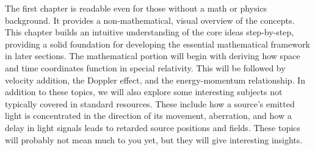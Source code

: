 The first chapter is readable even for those without a math or physics background. It provides a non-mathematical, visual overview of the concepts. This chapter builds an intuitive understanding of the core ideas step-by-step, providing a solid foundation for developing the essential mathematical framework in later sections. The mathematical portion will begin with deriving how space and time coordinates function in special relativity. This will be followed by velocity addition, the Doppler effect, and the energy-momentum relationship. In addition to these topics, we will also explore some interesting subjects not typically covered in standard resources. These include how a source’s emitted light is concentrated in the direction of its movement, aberration, and how a delay in light signals leads to retarded source positions and fields. These topics will probably not mean much to you yet, but they will give interesting insights.


\newpage

